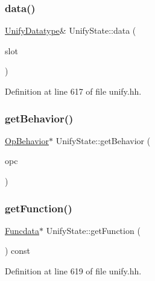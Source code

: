 \subsubsection{\texorpdfstring{data()}{data()}}
{\footnotesize\ttfamily \mbox{\hyperlink{class_unify_datatype}{Unify\+Datatype}}\& Unify\+State\+::data (\begin{DoxyParamCaption}\item[{int4}]{slot }\end{DoxyParamCaption})\hspace{0.3cm}{\ttfamily [inline]}}



Definition at line 617 of file unify.\+hh.

\mbox{\label{class_unify_state_a53e0383888fa32afa3d22a13eec10033}} 
\subsubsection{\texorpdfstring{getBehavior()}{getBehavior()}}
{\footnotesize\ttfamily \mbox{\hyperlink{class_op_behavior}{Op\+Behavior}}$\ast$ Unify\+State\+::get\+Behavior (\begin{DoxyParamCaption}\item[{\mbox{\hyperlink{opcodes_8hh_abeb7dfb0e9e2b3114e240a405d046ea7}{Op\+Code}}}]{opc }\end{DoxyParamCaption})}

\mbox{\label{class_unify_state_a30bf553bae64a3d1503b8fce5ce5f6b1}} 
\subsubsection{\texorpdfstring{getFunction()}{getFunction()}}
{\footnotesize\ttfamily \mbox{\hyperlink{class_funcdata}{Funcdata}}$\ast$ Unify\+State\+::get\+Function (\begin{DoxyParamCaption}\item[{void}]{ }\end{DoxyParamCaption}) const\hspace{0.3cm}{\ttfamily [inline]}}



Definition at line 619 of file unify.\+hh.


